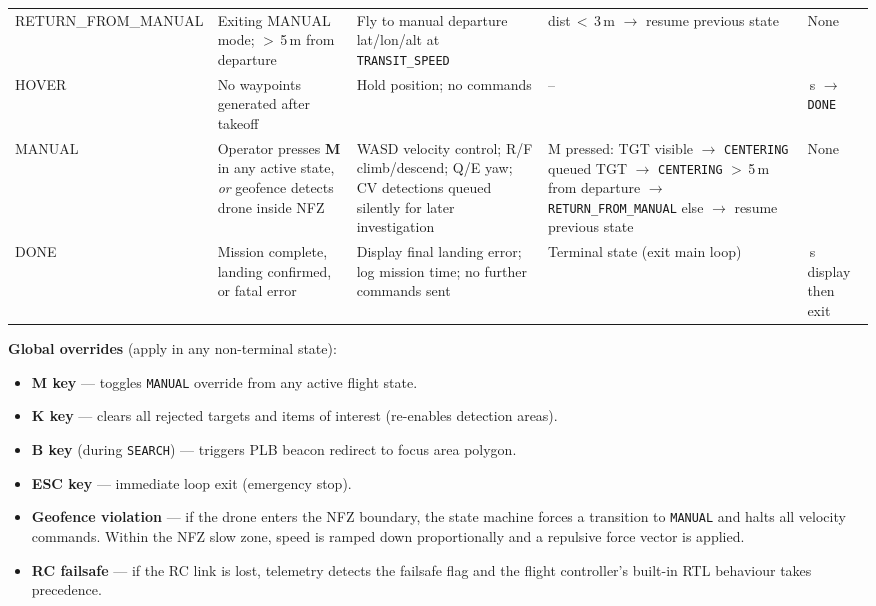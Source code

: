 \begin{small}
\begin{longtable}{
  @{}
  >{\ttfamily\raggedright}p{2.6cm}
  p{3.0cm}
  p{3.2cm}
  p{3.8cm}
  >{\raggedright\arraybackslash}p{2.2cm}
  @{}
}
RETURN\_FROM\_MANUAL &
  Exiting MANUAL mode; $>$\,5\,m from departure &
  Fly to manual departure lat/lon/alt at \texttt{TRANSIT\_SPEED} &
  dist\,$<$\,3\,m $\to$ resume previous state &
  None \\
\addlinespace

HOVER &
  No waypoints generated after takeoff &
  Hold position; no commands &
  -- &
  60\,s $\to$ \texttt{DONE} \\
\addlinespace

MANUAL &
  Operator presses \textbf{M} in any active state, \emph{or} geofence detects drone inside NFZ &
  WASD velocity control; R/F climb/descend; Q/E yaw; CV detections queued silently for later investigation &
  M pressed: \newline
  \quad TGT visible $\to$ \texttt{CENTERING} \newline
  \quad queued TGT $\to$ \texttt{CENTERING} \newline
  \quad $>$\,5\,m from departure $\to$ \texttt{RETURN\_FROM\_MANUAL} \newline
  \quad else $\to$ resume previous state &
  None \\
\addlinespace

DONE &
  Mission complete, landing confirmed, or fatal error &
  Display final landing error; log mission time; no further commands sent &
  Terminal state (exit main loop) &
  3\,s display then exit \\

\end{longtable}
\end{small}

\noindent\textbf{Global overrides} (apply in any non-terminal state):
\begin{itemize}[nosep]
  \item \textbf{M key} --- toggles \texttt{MANUAL} override from any active flight state.
  \item \textbf{K key} --- clears all rejected targets and items of interest (re-enables detection areas).
  \item \textbf{B key} (during \texttt{SEARCH}) --- triggers PLB beacon redirect to focus area polygon.
  \item \textbf{ESC key} --- immediate loop exit (emergency stop).
  \item \textbf{Geofence violation} --- if the drone enters the NFZ boundary, the state machine forces a transition to \texttt{MANUAL} and halts all velocity commands. Within the NFZ slow zone, speed is ramped down proportionally and a repulsive force vector is applied.
  \item \textbf{RC failsafe} --- if the RC link is lost, telemetry detects the failsafe flag and the flight controller's built-in RTL behaviour takes precedence.
\end{itemize}
